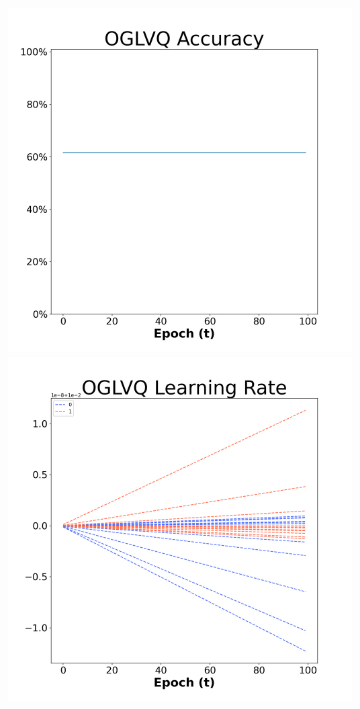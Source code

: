 \begin{figure}[H]
    \centering %
\begin{subfigure}{0.3\textwidth}
  \includegraphics[width=\linewidth]{images/exper1/SP/OGLVQ_0.01_acc.png}
    \includegraphics[width=\linewidth]{images/exper1/SP/OGLVQ_0.01_lr.png}

\end{subfigure}
\end{figure}
